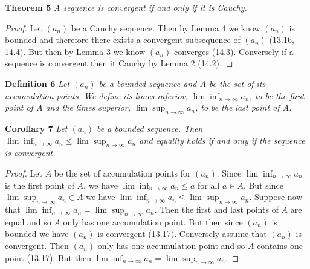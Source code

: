 \documentclass{article}
\begin{document}
\begin{flushleft}
\textbf{Theorem 5}
\textsl{A sequence is convergent if and only if it is Cauchy.}
\begin{proof}
Let $(a_n)$ be a Cauchy sequence. Then by Lemma 4 we know $(a_n)$ is bounded and therefore there exists a convergent subsequence of $(a_n)$ (13.16, 14.4). But then by Lemma 3 we know $(a_n)$ converges (14.3). Conversely if a sequence is convergent then it Cauchy by Lemma 2 (14.2).
\end{proof}

\textbf{Definition 6}
\textsl{Let $(a_n)$ be a bounded sequence and $A$ be the set of its accumulation points. We define its limes inferior, $\lim \inf_{n \rightarrow \infty} a_n$, to be the first point of $A$ and the limes superior, $\lim \sup_{n \rightarrow \infty} a_n$, to be the last point of $A$.}\newline

\textbf{Corollary 7}
\textsl{Let $(a_n)$ be a bounded sequence. Then $\lim \inf_{n \rightarrow \infty} a_n \leq 
\lim \sup_{n \rightarrow \infty} a_n$ and equality holds if and only if the sequence is convergent.}
\begin{proof}
Let $A$ be the set of accumulation points for $(a_n)$. Since $\lim \inf_{n \rightarrow \infty} a_n$ is the first point of $A$, we have $\lim \inf_{n \rightarrow \infty} a_n \leq a$ for all $a \in A$. But since $\lim \sup_{n \rightarrow \infty} a_n \in A$ we have $\lim \inf_{n \rightarrow \infty} a_n \leq \lim \sup_{n \rightarrow \infty} a_n$. Suppose now that $\lim \inf_{n \rightarrow \infty} a_n = \lim \sup_{n \rightarrow \infty} a_n$. Then the first and last points of $A$ are equal and so $A$ only has one accumulation point. But then since $(a_n)$ is bounded we have $(a_n)$ is convergent (13.17). Conversely assume that $(a_n)$ is convergent. Then $(a_n)$ only has one accumulation point and so $A$ contains one point (13.17). But then $\lim \inf_{n \rightarrow \infty} a_n = \lim \sup_{n \rightarrow \infty} a_n$.
\end{proof}


\end{flushleft}
\end{document}
